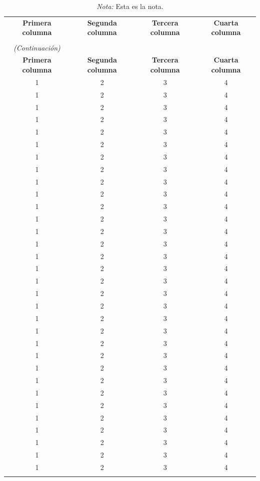 \begin{longtable}{|c|c|c|c|}
	\captionsetup{width=0.82\textwidth}
	\caption{Un ejemplo simple de tabla larga} 	
	\label{tb:TablaLarga}\\
	\hline
	\textbf{Primera columna} & \textbf{Segunda columna} & \textbf{Tercera columna} & \textbf{Cuarta columna} \\
	\hline
	\endfirsthead

	\caption*{\normalfont\textbf{\tablename{} \thetable} \\ \textit{(Continuación)}} \\

	\hline
	\textbf{Primera columna} & \textbf{Segunda columna} & \textbf{Tercera columna} & \textbf{Cuarta columna} \\
	\hline
	\endhead
	\endlastfoot
		
	1 & 2 & 3 & 4 \\ 1 & 2 & 3 & 4 \\ 1 & 2 & 3 & 4 \\ 1 & 2 & 3 & 4 \\
	1 & 2 & 3 & 4 \\ 1 & 2 & 3 & 4 \\ 1 & 2 & 3 & 4 \\ 1 & 2 & 3 & 4 \\
	1 & 2 & 3 & 4 \\ 1 & 2 & 3 & 4 \\ 1 & 2 & 3 & 4 \\ 1 & 2 & 3 & 4 \\
	1 & 2 & 3 & 4 \\ 1 & 2 & 3 & 4 \\ 1 & 2 & 3 & 4 \\ 1 & 2 & 3 & 4 \\
	1 & 2 & 3 & 4 \\ 1 & 2 & 3 & 4 \\ 1 & 2 & 3 & 4 \\ 1 & 2 & 3 & 4 \\
	1 & 2 & 3 & 4 \\ 1 & 2 & 3 & 4 \\ 1 & 2 & 3 & 4 \\ 1 & 2 & 3 & 4 \\
	1 & 2 & 3 & 4 \\ 1 & 2 & 3 & 4 \\ 1 & 2 & 3 & 4 \\ 1 & 2 & 3 & 4 \\
	1 & 2 & 3 & 4 \\ 1 & 2 & 3 & 4 \\ 1 & 2 & 3 & 4 \\ 1 & 2 & 3 & 4 \\
	\hline	
	\caption*{\textit{Nota:} Esta es la nota.}
\end{longtable}

